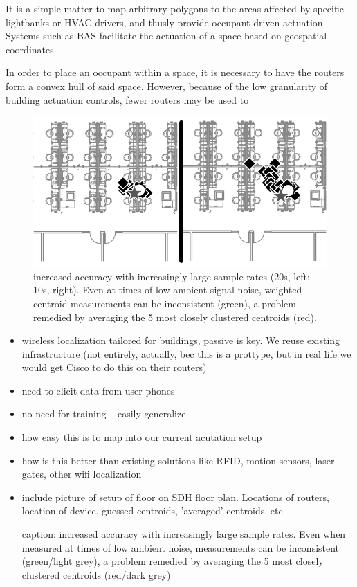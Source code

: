 It is a simple matter to map arbitrary polygons to the areas affected by specific lightbanks or HVAC drivers, and thusly provide occupant-driven actuation. Systems such as BAS facilitate the actuation of a space based on geospatial coordinates.

In order to place an occupant within a space, it is necessary to have the routers form a convex hull of said space. However, because of the low granularity of building actuation controls, fewer routers may be used to 

\begin{figure}[htb]
\begin{center}
\includegraphics[width=.6\linewidth]{figs/samplesize}
\end{center}
\caption{increased accuracy with increasingly large sample rates (20s, left; 10s, right). Even at times of low ambient signal noise, weighted centroid measurements can be inconsistent (green), a problem remedied by averaging the 5 most closely clustered centroids (red).}
\end{figure}

\begin{itemize}
\item wireless localization tailored for buildings, passive is key. We reuse existing infrastructure (not entirely, actually, bec this is a prottype, but in real life we would get Cisco to do this on their routers)

\item need to elicit data from user phones

\item no need for training -- easily generalize

\item how easy this is to map into our current acutation setup

\item how is this better than existing solutions like RFID, motion sensors, laser gates, other wifi localization

\item include picture of setup of floor on SDH floor plan. Locations of routers, location of device, guessed centroids, 'averaged' centroids, etc

caption: increased accuracy with increasingly large sample rates. Even when measured at times of low ambient noise, measurements can be inconsistent (green/light grey), a problem remedied by averaging the 5 most closely clustered centroids (red/dark grey)

\end{itemize}